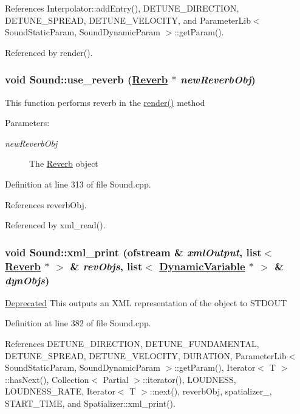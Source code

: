 References Interpolator::add\-Entry(), DETUNE\_\-DIRECTION, DETUNE\_\-SPREAD, DETUNE\_\-VELOCITY, and Parameter\-Lib$<$ Sound\-Static\-Param, Sound\-Dynamic\-Param $>$::get\-Param().

Referenced by render().\hypertarget{classSound_a8}{
\subsubsection[use\_\-reverb]{\setlength{\rightskip}{0pt plus 5cm}void Sound::use\_\-reverb (\hyperlink{classReverb}{Reverb} $\ast$ {\em new\-Reverb\-Obj})}}
\label{classSound_a8}


This function performs reverb in the \hyperlink{classSound_a6}{render()} method \begin{Desc}
\item[Parameters:]
\begin{description}
\item[{\em new\-Reverb\-Obj}]The \hyperlink{classReverb}{Reverb} object \end{description}
\end{Desc}


Definition at line 313 of file Sound.cpp.

References reverb\-Obj.

Referenced by xml\_\-read().\hypertarget{classSound_a9}{
\subsubsection[xml\_\-print]{\setlength{\rightskip}{0pt plus 5cm}void Sound::xml\_\-print (ofstream \& {\em xml\-Output}, list$<$ \hyperlink{classReverb}{Reverb} $\ast$ $>$ \& {\em rev\-Objs}, list$<$ \hyperlink{classDynamicVariable}{Dynamic\-Variable} $\ast$ $>$ \& {\em dyn\-Objs})}}
\label{classSound_a9}


\begin{Desc}
\item[\hyperlink{deprecated__deprecated000033}{Deprecated}]This outputs an XML representation of the object to STDOUT \end{Desc}


Definition at line 382 of file Sound.cpp.

References DETUNE\_\-DIRECTION, DETUNE\_\-FUNDAMENTAL, DETUNE\_\-SPREAD, DETUNE\_\-VELOCITY, DURATION, Parameter\-Lib$<$ Sound\-Static\-Param, Sound\-Dynamic\-Param $>$::get\-Param(), Iterator$<$ T $>$::has\-Next(), Collection$<$ Partial $>$::iterator(), LOUDNESS, LOUDNESS\_\-RATE, Iterator$<$ T $>$::next(), reverb\-Obj, spatializer\_\-, START\_\-TIME, and Spatializer::xml\_\-print().


